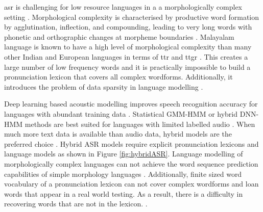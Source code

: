 \gls{asr} is challenging for low resource languages in a
a morphologically complex setting \cite{besacier2014automatic}. Morphological
complexity is characterised by productive word formation by agglutination,
inflection, and compounding, leading to very long words with phonetic and
orthographic changes at morpheme boundaries \cite{baerman2015understanding}.
Malayalam language is known to have a high level of morphological complexity
than many other Indian and European languages in terms of \gls{ttr} and
\gls{ttgr}
\cite{bharadwaja2007statistical,manohar_quantitative_2020}. This creates a large
number of low frequency words and it is practically impossible to build a
pronunciation lexicon that covers all complex wordforms. Additionally, it
introduces the problem of data sparsity in language modelling
\cite{SMIT2021101158}.

Deep learning based acoustic modelling improves speech recognition accuracy for
languages with abundant training data \cite{thai-etal-2020-fully}. Statistical GMM-HMM
or hybrid DNN-HMM methods are best suited for languages with limited labelled
audio \cite{georgescu2021performance}. When much more text data is available
than audio data, hybrid models are the preferred choice
\cite{bayerl2019comparison,aku2021specom}. Hybrid ASR models require explicit
pronunciation lexicons and language models as shown in Figure \ref{fig:hybridASR}.
Language modelling of morphologically complex languages can not achieve the
word sequence prediction capabilities of simple morphology languages
\cite{mielke-etal-2019-kind,10.1162/tacl00365}. Additionally, finite sized word
vocabulary of a pronunciation lexicon can not cover complex wordforms and loan
words that appear in a real world testing. As a result, there is a difficulty
in recovering words that are not in the lexicon. \cite{SMIT2021101158}.


